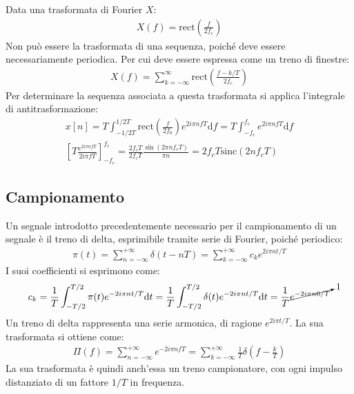\documentclass{article}
\newcommand{\rect}{\mathrm{rect}}
\newcommand{\sinc}{\mathrm{sinc}}
\newcommand{\df}{\mathrm{d}}
\numberwithin{equation}{subsection}
\begin{document}
Data una trasformata di Fourier $X$:
\begin{gather*}
    X(f)=\rect\displaystyle\left(\frac{f}{2f_c}\right)
\end{gather*}
Non può essere la trasformata di una sequenza, poiché deve essere necessariamente periodica. Per cui deve essere espressa come un treno di finestre:
\begin{gather*}
    X(f)=\displaystyle\sum_{k=-\infty}^{\infty}\rect\left(\frac{f-k/T}{2f_c}\right)
\end{gather*}
Per determinare la sequenza associata a questa trasformata si applica l'integrale di antitrasformazione:
\begin{gather*}
    x[n]=T\displaystyle\int_{-1/2T}^{1/2T}\rect\left(\frac{f}{2f_0}\right)e^{2i\pi n fT}\df f=T\int_{-f_c}^{f_c}e^{2i\pi nfT}\df f\\
    \displaystyle\left[T\frac{e^{2i\pi nfT}}{2i\pi fT}\right]^{f_c}_{-f_c}=\frac{2f_cT}{2f_cT}\frac{\sin(2\pi nf_cT)}{\pi n}=2f_cT\sinc(2nf_cT)
\end{gather*}

\subsection{Campionamento}

Un segnale introdotto precedentemente necessario per il campionamento di un segnale è il treno di delta, esprimibile tramite serie di Fourier, poiché periodico:
\begin{gather}
    \pi(t)=\displaystyle\sum_{n=-\infty}^{+\infty}\delta\left(t-nT\right)=\sum_{k=-\infty}^{+\infty}c_ke^{2i\pi nt/T}
\end{gather}
I suoi coefficienti si esprimono come:
\begin{gather*}
    c_k=\displaystyle\frac{1}{T}\int_{-T/2}^{T/2}\pi(t)e^{-2i\pi nt/T}\df t=\frac{1}{T}\int_{-T/2}^{T/2}\delta(t)e^{-2i\pi nt/T}\df t=\frac{1}{T}\cancelto{1}{e^{-2i\pi n0/T}}
\end{gather*}
Un treno di delta rappresenta una serie armonica, di ragione $e^{2i\pi t/T}$. La sua trasformata si ottiene come:
\begin{gather}
    \Pi(f)=\displaystyle\sum_{n=-\infty}^{+\infty}e^{-2i\pi nfT}=\sum_{k=-\infty}^{+\infty}\frac{1}{T}\delta\left(f-\frac{k}{T}\right)
\end{gather}
La sua trasformata è quindi anch'essa un treno campionatore, con ogni impulso distanziato di un fattore $1/T$ in frequenza. 
\end{document}
